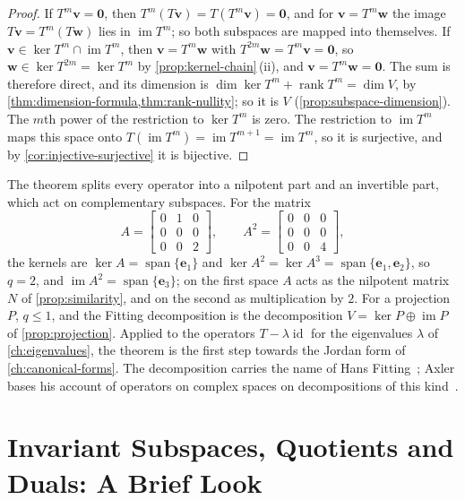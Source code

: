 \begin{proof}
If $T^m\mathbf v=\mathbf 0$, then $T^m(T\mathbf v)=T(T^m\mathbf v)=\mathbf 0$, and for $\mathbf v=T^m\mathbf w$ the image $T\mathbf v=T^m(T\mathbf w)$ lies in $\operatorname{im}T^m$; so both subspaces are mapped into themselves. If $\mathbf v\in\ker T^m\cap\operatorname{im}T^m$, then $\mathbf v=T^m\mathbf w$ with $T^{2m}\mathbf w=T^m\mathbf v=\mathbf 0$, so $\mathbf w\in\ker T^{2m}=\ker T^m$ by \cref{prop:kernel-chain}\,(ii), and $\mathbf v=T^m\mathbf w=\mathbf 0$. The sum is therefore direct, and its dimension is $\dim\ker T^m+\operatorname{rank}T^m=\dim V$, by \cref{thm:dimension-formula,thm:rank-nullity}; so it is $V$ (\cref{prop:subspace-dimension}). The $m$th power of the restriction to $\ker T^m$ is zero. The restriction to $\operatorname{im}T^m$ maps this space onto $T(\operatorname{im}T^m)=\operatorname{im}T^{m+1}=\operatorname{im}T^m$, so it is surjective, and by \cref{cor:injective-surjective} it is bijective.
\end{proof}

The theorem splits every operator into a nilpotent part and an invertible part, which act on complementary subspaces. For the matrix
\[
A=\begin{bmatrix}0&1&0\\0&0&0\\0&0&2\end{bmatrix},\qquad A^2=\begin{bmatrix}0&0&0\\0&0&0\\0&0&4\end{bmatrix},
\]
the kernels are $\ker A=\operatorname{span}\{\mathbf e_1\}$ and $\ker A^2=\ker A^3=\operatorname{span}\{\mathbf e_1,\mathbf e_2\}$, so $q=2$, and $\operatorname{im}A^2=\operatorname{span}\{\mathbf e_3\}$; on the first space $A$ acts as the nilpotent matrix $N$ of \cref{prop:similarity}, and on the second as multiplication by $2$. For a projection $P$, $q\le1$, and the Fitting decomposition is the decomposition $V=\ker P\oplus\operatorname{im}P$ of \cref{prop:projection}. Applied to the operators $T-\lambda\operatorname{id}$ for the eigenvalues $\lambda$ of \cref{ch:eigenvalues}, the theorem is the first step towards the Jordan form of \cref{ch:canonical-forms}. The decomposition carries the name of Hans Fitting~\cite{fitting1933}; Axler bases his account of operators on complex spaces on decompositions of this kind~\cite[Chap.~8]{axler2024}.

\section{Invariant Subspaces, Quotients and Duals: A Brief Look}
\label{sec:invariant-quotient-dual}

